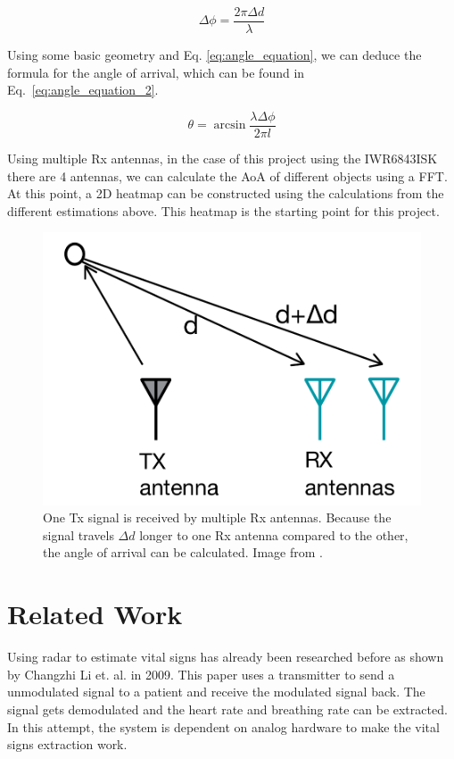 \begin{equation}
\Delta \phi = \frac{2 \pi \Delta d}{\lambda}
\label{eq:angle_equation}
\end{equation}

Using some basic geometry and Eq. \ref{eq:angle_equation}, we can deduce the formula for the angle of arrival, which can be found in Eq.~\ref{eq:angle_equation_2}.

\begin{equation}
\theta = \arcsin{\frac{\lambda \Delta \phi}{2 \pi l}}
\label{eq:angle_equation_2}
\end{equation}

Using multiple Rx antennas, in the case of this project using the IWR6843ISK there are 4 antennas, we can calculate the AoA of different objects using a FFT. At this point, a 2D heatmap can be constructed using the calculations from the different estimations above. This heatmap is the starting point for this project.

\begin{figure}[t]
\centering
\includegraphics[width=.5\textwidth]{figures/background/angle_estimation.png}
\caption{One Tx signal is received by multiple Rx antennas. Because the signal travels $\Delta d$ longer to one Rx antenna compared to the other, the angle of arrival can be calculated. Image from \cite{mmwave_fundamentals_website}.}
\label{fig:angle_estimation}
\end{figure}

\section{Related Work}
\label{sec:related_work}
Using radar to estimate vital signs has already been researched before as shown by Changzhi Li et. al. \cite{li2009radar} in 2009. This paper uses a transmitter to send a unmodulated signal to a patient and receive the modulated signal back. The signal gets demodulated and the heart rate and breathing rate can be extracted. In this attempt, the system is dependent on analog hardware to make the vital signs extraction work. 

